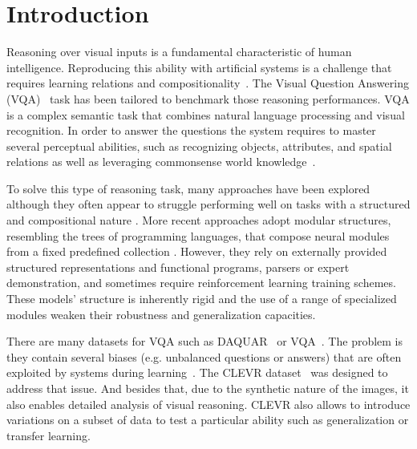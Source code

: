 \section{Introduction}
Reasoning over visual inputs is a fundamental characteristic of human intelligence.
Reproducing this ability with artificial systems is a challenge that requires learning relations and compositionality~\citep{hu2017learning, johnson2017inferring}. The Visual Question Answering (VQA)~\citep{antol2015vqa,malinowski2014towards,wu2017visual} task has been tailored to benchmark those reasoning performances. VQA is a complex semantic task that combines natural language processing and visual recognition.
In order to answer the questions the system  requires to master several perceptual abilities, such as recognizing objects, attributes, and spatial relations as well as leveraging commonsense world knowledge~\citep{hudson2018compositional}.

To solve this type of reasoning task, many approaches have been explored although they often appear to struggle performing well on tasks with a structured and compositional nature \citep{hudson2018compositional}.
More recent approaches adopt modular structures, resembling the trees of programming languages, that compose neural modules from a fixed predefined collection \cite{andreas2016learning,johnson2017inferring, mascharka2018transparency}. However, they rely on externally provided structured representations and functional programs, parsers or expert demonstration, and sometimes require reinforcement learning training schemes.
These models' structure is inherently rigid and the use of a range of specialized modules weaken their robustness and generalization capacities.

There are many datasets for VQA such as DAQUAR~\citep{malinowski2014multi} or VQA~\citep{antol2015vqa}. The problem is they contain several biases (e.g. unbalanced questions or answers) that are often exploited by systems during learning~\citep{goyal2017making}.
The CLEVR dataset~\citep{johnson2017clevr} was designed to address that issue.
And besides that, due to the synthetic nature of the images, it also enables detailed analysis of visual reasoning.
CLEVR also allows to introduce variations on a subset of data to test a particular ability such as generalization or transfer learning.


